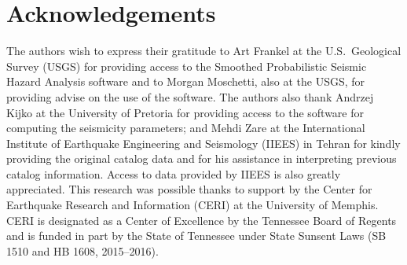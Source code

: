 \section{Acknowledgements}

The authors wish to express their gratitude to Art Frankel at the U.S.~Geological Survey (USGS) for providing access to the Smoothed Probabilistic Seismic Hazard Analysis software and to Morgan Moschetti, also at the USGS, for providing advise on the use of the software. The authors also thank Andrzej Kijko at the University of Pretoria for providing access to the software for computing the seismicity parameters; and Mehdi Zare at the International Institute of Earthquake Engineering and Seismology (IIEES) in Tehran for kindly providing the original catalog data and for his assistance in interpreting previous catalog information. Access to data provided by IIEES is also greatly appreciated. This research was possible thanks to support by the Center for Earthquake Research and Information (CERI) at the University of Memphis. CERI is designated as a Center of Excellence by the Tennessee Board of Regents and is funded in part by the State of Tennessee under State Sunsent Laws (SB 1510 and HB 1608, 2015--2016).
 